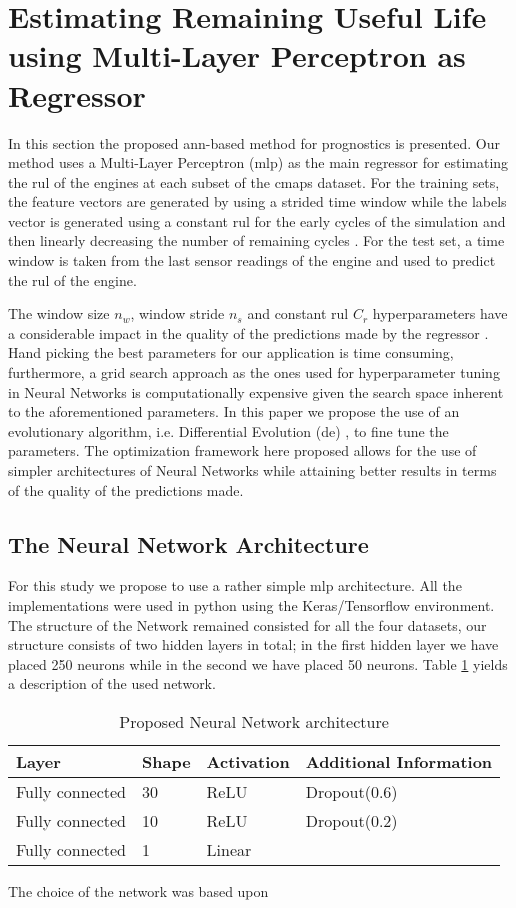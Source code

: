 \section{Estimating Remaining Useful Life using Multi-Layer Perceptron as Regressor}
\label{sec:method}

In this section the proposed \gls{ann}-based method for prognostics is presented. Our method uses a Multi-Layer Perceptron (\gls{mlp}) as the main regressor for estimating the \gls{rul} of the engines at each subset of the \gls{cmaps} dataset. For the training sets, the feature vectors are generated by using a strided time window while the labels vector is generated using a constant \gls{rul} for the early cycles of the simulation and then linearly decreasing the number of remaining cycles \cite{Li2018, Lim2016}. For the test set, a time window is taken from the last sensor readings of the engine and used to predict the \gls{rul} of the engine. 

The window size $n_w$, window stride $n_s$ and constant \gls{rul} $C_r$ hyperparameters have a considerable impact in the quality of the predictions made by the regressor \cite{Li2018, Lim2016}. Hand picking the best parameters for our application is time consuming, furthermore, a grid search approach as the ones used for hyperparameter tuning in Neural Networks is computationally expensive given the search space inherent to the aforementioned parameters. In this paper we propose the use of an evolutionary algorithm, i.e. Differential Evolution (\gls{de}) \cite{Storn1997}, to fine tune the parameters. The optimization framework here proposed allows for the use of simpler architectures of Neural Networks while attaining better results in terms of the quality of the predictions made.

\subsection{The Neural Network Architecture}

For this study we propose to use a rather simple \gls{mlp} architecture. All the implementations were used in python using the Keras/Tensorflow environment. The structure of the Network remained consisted for all the four datasets, our structure consists of two hidden layers in total; in the first hidden layer we have placed 250 neurons while in the second we have placed 50 neurons. Table \ref{table:proposed_nn} yields a description of the used network.

\begin{table}[!htb]
\centering
\begin{tabular}{l l l l}
	\hline
	Layer & Shape & Activation & Additional Information\\
  	\hline
  	Fully connected & 30 & ReLU & Dropout(0.6)\\
  	Fully connected & 10 & ReLU & Dropout(0.2)\\
  	Fully connected & 1 & Linear & \\
  	\hline
\end{tabular}
\caption{Proposed Neural Network architecture}
\label{table:proposed_nn}
\end{table}

The choice of the network was based upon 